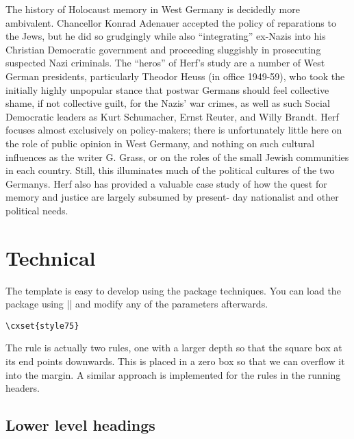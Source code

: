 \begin{figure}[ht]
\centering
{}
\end{figure}

The history of Holocaust memory in West Germany is decidedly more ambivalent. Chancellor Konrad Adenauer accepted the policy of reparations to the Jews, but he did so grudgingly while also ``integrating'' ex-Nazis into his Christian Democratic government and proceeding sluggishly in prosecuting suspected Nazi criminals. The ``heros'' of Herf's study are a number of West German presidents, particularly Theodor Heuss (in office 1949-59), who took the initially highly unpopular stance that postwar Germans should feel collective shame, if not collective guilt, for the Nazis' war crimes, as well as such Social Democratic leaders as Kurt Schumacher, Ernst Reuter, and Willy Brandt. Herf focuses almost exclusively on policy-makers; there is unfortunately little here on the role of public opinion in West Germany, and nothing on such cultural influences as the writer G. Grass, or on the roles of the small Jewish communities in each country. Still, this illuminates much of the political cultures of the two Germanys. Herf also has provided a valuable case study of how the quest for memory and justice are largely subsumed by present- day nationalist and other political needs.



\section{Technical}

The template is easy to develop using the  package techniques. You can load the package using
|\cxsetstyle| and modify any of the parameters afterwards.

\begin{verbatim}
\cxset{style75}
\end{verbatim}

The rule is actually two rules, one with a larger depth so that the square box at its end points downwards.
This is placed in a zero box so that we can overflow it into the margin. A similar approach is implemented for the rules in the running headers.

\subsection{Lower level headings}

